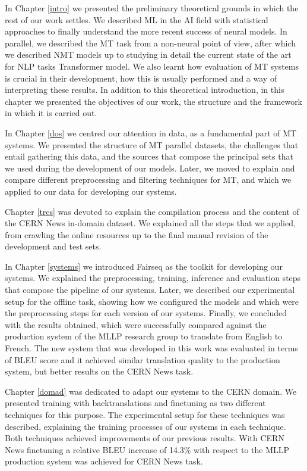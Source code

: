 \documentclass[11pt,english,listoffigures,listoftables]{tfgetsinf}
\begin{document}
In Chapter \ref{intro} we presented the preliminary theoretical grounds in which the rest of our work settles.
We described ML in the AI field with statistical approaches to finally understand the more recent success of neural models. In parallel, we described the MT task from a non-neural point of view, after which we described NMT models up to studying in detail the current state of the art for NLP tasks Transformer model. We also learnt how evaluation of MT systems is crucial in their development, how this is usually performed and a way of interpreting these results.
In addition to this theoretical introduction, in this chapter we presented the objectives of our work, the structure and the framework in which it is carried out.

In Chapter \ref{dos} we centred our attention in data, as a fundamental part of MT systems. We presented the structure of MT parallel datasets, the challenges that entail gathering this data, and the sources that compose the principal sets that we used during the development of our models. Later, we moved to explain and compare different preprocessing and filtering techniques for MT, and which we applied to our data for developing our systems.

Chapter \ref{tres} was devoted to explain the compilation process and the content of the CERN News in-domain dataset. We explained all the steps that we applied, from crawling the online resources up to the final manual revision of the development and test sets.

In Chapter \ref{systems} we introduced Fairseq as the toolkit for developing our systems. We explained the preprocessing, training, inference and evaluation steps that compose the pipeline of our systems. Later, we described our experimental setup for the offline task, showing how we configured the models and which were the preprocessing steps for each version of our systems. Finally, we concluded with the results obtained, which were successfully compared against the production system of the MLLP research group to translate from English to French. The new system that was developed in this work was evaluated in terms of BLEU score and it achieved similar translation quality to the production system, but better results on the CERN News task.

Chapter \ref{domad} was dedicated to adapt our systems to the CERN domain. We presented training with backtranslations and finetuning as two different techniques for this purpose. The experimental setup for these techniques was described, explaining the training processes of our systems in each technique. Both techniques achieved improvements of our previous results. With CERN News finetuning a relative BLEU increase of 14.3\% 
with respect to the MLLP production system was achieved for CERN News task.
\end{document}
